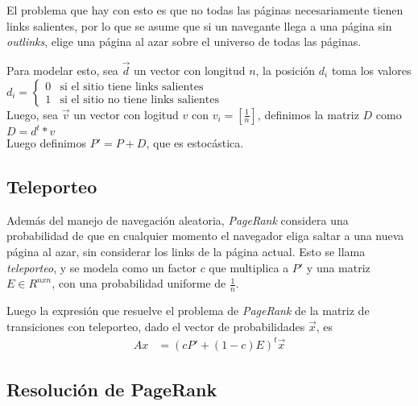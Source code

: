 El problema que hay con esto es que no todas las páginas necesariamente tienen links
salientes, por lo que se asume que si un navegante llega a una página sin \textit{outlinks},
elige una página al azar sobre el universo de todas las páginas.

Para modelar esto, sea $\vec{d}$ un vector con longitud $n$, la posición $d_i$ toma los valores\\

\begin{math}
d_i =
\left\{
\begin{array}{ll}
0   & \mbox{si el sitio tiene links salientes}\\
1   & \mbox{si el sitio no tiene links salientes}
\end{array}
\right.
\end{math}\\

Luego, sea $\vec{v}$ un vector con logitud $v$ con $v_i = [\frac{1}{n}]$, definimos
la matriz $D$ como\\

\begin{math}
D = d^t * v
\end{math}\\

Luego definimos $P' = P + D$, que es estocástica.

\subsection{Teleporteo}

Además del manejo de navegación aleatoria, \textit{PageRank} considera una probabilidad de que
en cualquier momento el navegador eliga saltar a una nueva página al azar, sin considerar
los links de la página actual. Esto se llama \textit{teleporteo}, y se modela como un factor
$c$ que multiplica a $P'$  y una matriz $E \in R^{nxn}$, con una probabilidad uniforme de $\frac{1}{n}$.

Luego la expresión que resuelve el problema de \textit{PageRank} de la matriz de transiciones
con teleporteo, dado el vector de probabilidades $\vec{x}$, es\\

\begin{align*}
Ax & =(cP' + (1-c)E)^{t} \vec{x}
\end{align*}

\subsection{Resolución de PageRank}

